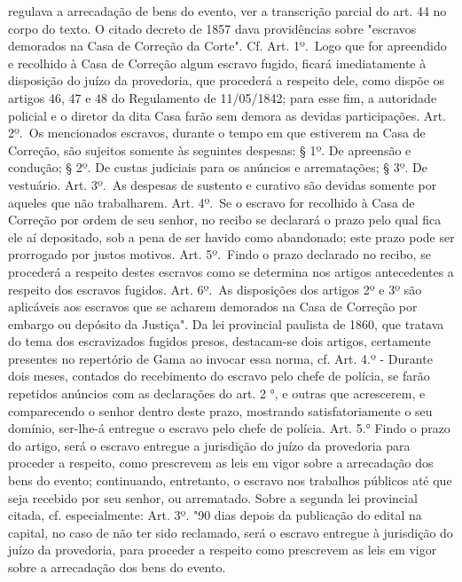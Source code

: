 {  regulava a arrecadação de bens do evento, ver a transcrição parcial do
  art. 44 no corpo do texto. O citado decreto de 1857 dava providências
  sobre "escravos demorados na Casa de Correção da Corte". Cf. Art.
  1º.~Logo que for apreendido e recolhido à Casa de Correção algum
  escravo fugido, ficará imediatamente à disposição do juízo da
  provedoria, que procederá a respeito dele, como dispõe os artigos 46,
  47 e 48 do Regulamento de 11/05/1842; para esse fim, a autoridade
  policial e o diretor da dita Casa farão sem demora as devidas
  participações. Art. 2º.~Os mencionados escravos, durante o tempo em
  que estiverem na Casa de Correção, são sujeitos somente às seguintes
  despesas: § 1º. De apreensão e condução; § 2º. De custas judiciais
  para os anúncios e arrematações; § 3º. De vestuário. Art. 3º.~As
  despesas de sustento e curativo são devidas somente por aqueles que
  não trabalharem. Art. 4º.~Se o escravo for recolhido à Casa de
  Correção por ordem de seu senhor, no recibo se declarará o prazo pelo
  qual fica ele aí depositado, sob a pena de ser havido como abandonado;
  este prazo pode ser prorrogado por justos motivos. Art. 5º.~Findo o
  prazo declarado no recibo, se procederá a respeito destes escravos
  como se determina nos artigos antecedentes a respeito dos escravos
  fugidos. Art. 6º.~As disposições dos artigos 2º e 3º são aplicáveis
  aos escravos que se acharem demorados na Casa de Correção por embargo
  ou depósito da Justiça". Da lei provincial paulista de 1860, que
  tratava do tema dos escravizados fugidos presos, destacam-se dois
  artigos, certamente presentes no repertório de Gama ao invocar essa
  norma, cf. Art. 4.º - Durante dois meses, contados do recebimento do
  escravo pelo chefe de polícia, se farão repetidos anúncios com as
  declarações do art. 2 °, e outras que acrescerem, e comparecendo o
  senhor dentro deste prazo, mostrando satisfatoriamente o seu domínio,
  ser-lhe-á entregue o escravo pelo chefe de polícia. Art. 5.° Findo o
  prazo do artigo, será o escravo entregue a jurisdição do juízo da
  provedoria para proceder a respeito, como prescrevem as leis em vigor
  sobre a arrecadação dos bens do evento; continuando, entretanto, o
  escravo nos trabalhos públicos até que seja recebido por seu senhor,
  ou arrematado. Sobre a segunda lei provincial citada, cf.
  especialmente: Art. 3º. "90 dias depois da publicação do edital na
  capital, no caso de não ter sido reclamado, será o escravo entregue à
  jurisdição do juízo da provedoria, para proceder a respeito como
  prescrevem as leis em vigor sobre a arrecadação dos bens do evento.
}
